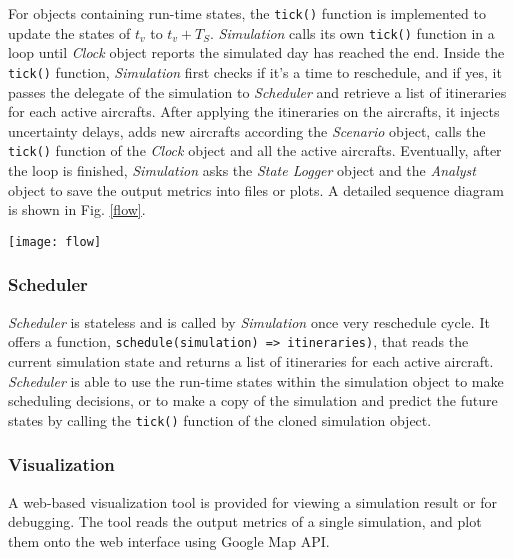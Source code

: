 \documentclass[letterpaper, 10 pt, conference]{ieeeconf}
\newcommand{\inlinecode}{\texttt}
\begin{document}
For objects containing run-time states, the \inlinecode{tick()} function is implemented to update the states of $t_v$ to $t_v + T_S$. {\it Simulation} calls its own \inlinecode{tick()} function in a loop until {\it Clock} object reports the simulated day has reached the end. Inside the \inlinecode{tick()} function, {\it Simulation} first checks if it's a time to reschedule, and if yes, it passes the delegate of the simulation to {\it Scheduler} and retrieve a list of itineraries for each active aircrafts. After applying the itineraries on the aircrafts, it injects uncertainty delays, adds new aircrafts according the {\it Scenario} object, calls the \inlinecode{tick()} function of the {\it Clock} object and all the active aircrafts. Eventually, after the loop is finished, {\it Simulation} asks the {\it State Logger} object and the {\it Analyst} object to save the output metrics into files or plots. A detailed sequence diagram is shown in Fig. \ref{flow}.



\begin{figure*}[h]
\caption{Sequence diagram of the tick() function}
\centering
\texttt{[image: flow]}
\label{flow}
\end{figure*}

\subsubsection{Scheduler}

{\it Scheduler} is stateless and is called by {\it Simulation} once very reschedule cycle. It offers a function, \inlinecode{schedule(simulation) => itineraries)}, that reads the current simulation state and returns a list of itineraries for each active aircraft. {\it Scheduler} is able to use the run-time states within the simulation object to make scheduling decisions, or to make a copy of the simulation and predict the future states by calling the \inlinecode{tick()} function of the cloned simulation object.

\subsubsection{Visualization}

A web-based visualization tool is provided for viewing a simulation result or for debugging. The tool reads the output metrics of a single simulation, and plot them onto the web interface using Google Map API.
\end{document}
